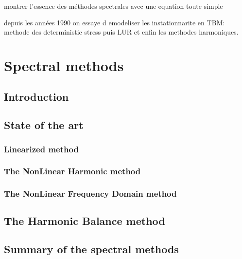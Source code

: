
montrer l'essence des méthodes spectrales avec une equation toute simple

depuis les années 1990 on essaye d emodeliser les instationnarite en TBM:
methode des deterministic stress puis LUR et enfin les methodes harmoniques.

\chapter{Spectral methods}
\label{cha:spectral_methods}

\section{Introduction}
\label{sec:sm_introduction}


\section{State of the art}
\label{sec:sm_state_of_the_art}


\subsection{Linearized method}
\label{sub:sm_lur}


\subsection{The NonLinear Harmonic method}
\label{sub:sm_nlh}


\subsection{The NonLinear Frequency Domain method}
\label{sub:sm_nlfd}


\section{The Harmonic Balance method}
\label{sec:sm_hb}


\section{Summary of the spectral methods}
\label{sec:sm_summary}

